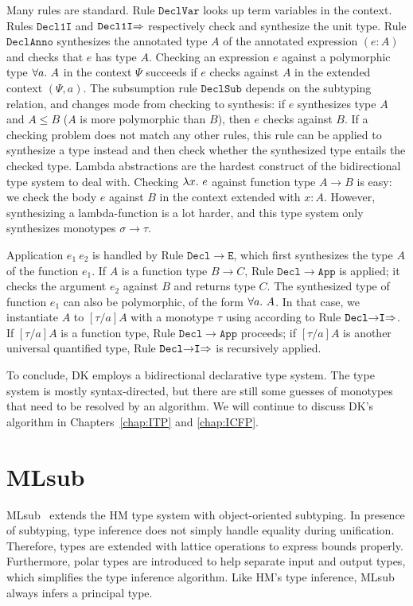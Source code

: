 Many rules are standard.
Rule $\mathtt{DeclVar}$ looks up term variables in the context.
Rules $\mathtt{Decl1I}$ and $\mathtt{Decl1I{\Rightarrow}}$ respectively check and synthesize the unit type.
Rule $\mathtt{DeclAnno}$ synthesizes the annotated type $A$ of the annotated expression $(e:A)$
and checks that $e$ has type $A$.
Checking an expression $e$ against a polymorphic type $\all A$ in the context $\Psi$ succeeds
if $e$ checks against $A$ in the extended context $(\Psi, a)$.
The subsumption rule $\mathtt{DeclSub}$ depends on the subtyping relation,
and changes mode from checking to synthesis: if $e$ synthesizes type $A$ and $A\le B$
($A$ is more polymorphic than $B$), then $e$ checks against $B$.
If a checking problem does not match any other rules,
this rule can be applied to synthesize a type instead and then
check whether the synthesized type entails the checked type.
Lambda abstractions are the hardest construct of the bidirectional
type system to deal with. 
Checking $\lam e$ against function type $A\to B$ is easy:
we check the body $e$ against $B$ in the context extended with $x:A$.
However, synthesizing a lambda-function is a lot harder, and 
this type system only synthesizes monotypes $\sigma\to\tau$.

Application $e_1~e_2$ is handled by Rule $\mathtt{Decl{\to}E}$,
which first synthesizes the type $A$ of the function $e_1$.
If $A$ is a function type $B\to C$, Rule $\mathtt{Decl{\to}App}$ is applied;
it checks the argument $e_2$ against $B$ and returns type $C$.
The synthesized type of function $e_1$ can also be polymorphic, of the form $\all A$.
In that case, we instantiate $A$ to $[\tau/a]A$ with a monotype $\tau$ %
using according to Rule $\mathtt{Decl{\to}I{\Rightarrow}}$.
If $[\tau/a]A$ is a function type, Rule $\mathtt{Decl{\to}App}$ proceeds;
if $[\tau/a]A$ is another universal quantified type,
Rule $\mathtt{Decl{\to}I{\Rightarrow}}$ is recursively applied.

To conclude, DK employs a bidirectional declarative type system.
The type system is mostly syntax-directed, but there are still
some guesses of monotypes that need to be resolved by an algorithm.
We will continue to discuss DK's algorithm in Chapters~\ref{chap:ITP} and \ref{chap:ICFP}.


\section{MLsub}\label{sec:mlsub}

MLsub~\citep{mlsub} extends the HM type system with object-oriented subtyping.
In presence of subtyping, type inference does not simply handle equality during unification.
Therefore, types are extended with lattice operations to express bounds properly.
Furthermore, polar types are introduced to help separate input and output types,
which simplifies the type inference algorithm.
Like HM's type inference, MLsub always infers a principal type.

